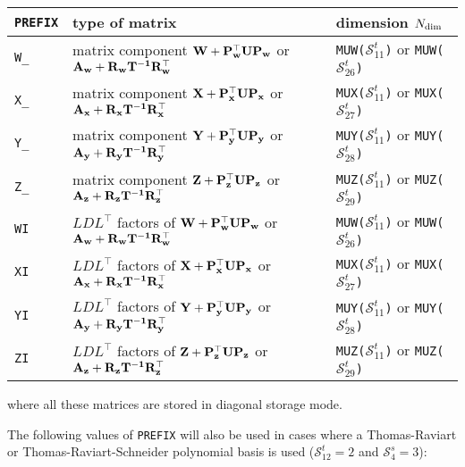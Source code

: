 \vskip 0.3cm

\begin{tabular}{|l|l|l|}
\hline
{\tt PREFIX} & type of matrix & dimension $N_{\rm dim}$\\
\hline
{\tt W\_} & matrix component $\bf{W}+\bf{P}_w^\top \bf{U}\bf{P}_w$ or $\bf{A}_w+\bf{R}_w\bf{T}^{-1}\bf{R}_w^\top$ & {\tt MUW(}$\mathcal{S}^{t}_{11}${\tt )} or {\tt MUW(}$\mathcal{S}^{t}_{26}${\tt )}\\
{\tt X\_} & matrix component $\bf{X}+\bf{P}_x^\top \bf{U}\bf{P}_x$ or $\bf{A}_x+\bf{R}_x\bf{T}^{-1}\bf{R}_x^\top$ & {\tt MUX(}$\mathcal{S}^{t}_{11}${\tt )} or {\tt MUX(}$\mathcal{S}^{t}_{27}${\tt )} \\
{\tt Y\_} & matrix component $\bf{Y}+\bf{P}_y^\top \bf{U}\bf{P}_y$ or $\bf{A}_y+\bf{R}_y\bf{T}^{-1}\bf{R}_y^\top$ & {\tt MUY(}$\mathcal{S}^{t}_{11}${\tt )} or {\tt MUY(}$\mathcal{S}^{t}_{28}${\tt )} \\
{\tt Z\_} & matrix component $\bf{Z}+\bf{P}_z^\top \bf{U}\bf{P}_z$ or $\bf{A}_z+\bf{R}_z\bf{T}^{-1}\bf{R}_z^\top$ & {\tt MUZ(}$\mathcal{S}^{t}_{11}${\tt )} or {\tt MUZ(}$\mathcal{S}^{t}_{29}${\tt )} \\
{\tt WI} & $LDL^\top$ factors of $\bf{W}+\bf{P}_w^\top \bf{U}\bf{P}_w$ or $\bf{A}_w+\bf{R}_w\bf{T}^{-1}\bf{R}_w^\top$ & {\tt MUW(}$\mathcal{S}^{t}_{11}${\tt )} or {\tt MUW(}$\mathcal{S}^{t}_{26}${\tt )}\\
{\tt XI} & $LDL^\top$ factors of $\bf{X}+\bf{P}_x^\top \bf{U}\bf{P}_x$ or $\bf{A}_x+\bf{R}_x\bf{T}^{-1}\bf{R}_x^\top$ & {\tt MUX(}$\mathcal{S}^{t}_{11}${\tt )} or {\tt MUX(}$\mathcal{S}^{t}_{27}${\tt )} \\
{\tt YI} & $LDL^\top$ factors of $\bf{Y}+\bf{P}_y^\top \bf{U}\bf{P}_y$ or $\bf{A}_y+\bf{R}_y\bf{T}^{-1}\bf{R}_y^\top$ & {\tt MUY(}$\mathcal{S}^{t}_{11}${\tt )} or {\tt MUY(}$\mathcal{S}^{t}_{28}${\tt )} \\
{\tt ZI} & $LDL^\top$ factors of $\bf{Z}+\bf{P}_z^\top \bf{U}\bf{P}_z$ or $\bf{A}_z+\bf{R}_z\bf{T}^{-1}\bf{R}_z^\top$ & {\tt MUZ(}$\mathcal{S}^{t}_{11}${\tt )} or {\tt MUZ(}$\mathcal{S}^{t}_{29}${\tt )} \\
\hline
\end{tabular}

\vskip 0.3cm

\noindent where all these matrices are stored in diagonal storage mode.

\vskip 0.3cm

The following values of {\tt PREFIX} will also be used in cases where a
Thomas-Raviart or Thomas-Raviart-Schneider polynomial basis is used ($\mathcal{S}^{t}_{12}=2$ and
$\mathcal{S}^{s}_{4}=3$):

